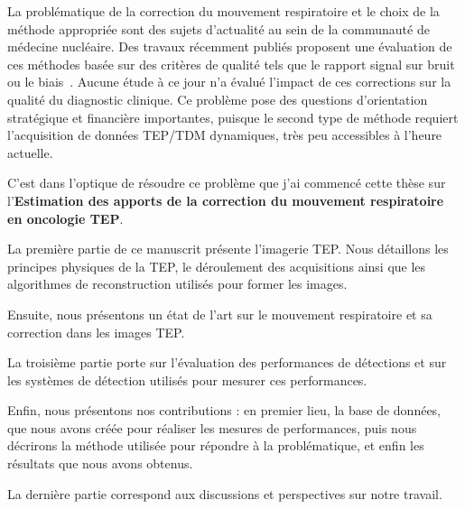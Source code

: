 La problématique de la correction du mouvement respiratoire et le choix de la méthode appropriée sont des sujets d’actualité au sein de la communauté de médecine nucléaire. Des travaux récemment publiés proposent une évaluation de ces méthodes basée sur des critères de qualité tels que le rapport signal sur bruit ou le biais~\cite{visvikis2004evaluation}. Aucune étude à ce jour n’a évalué l’impact de ces corrections sur la qualité du diagnostic clinique. Ce problème pose des questions d’orientation stratégique et financière importantes, puisque le second type de méthode requiert l’acquisition de données TEP/TDM dynamiques, très peu accessibles à l’heure actuelle.

C'est dans l'optique de résoudre ce problème que j'ai commencé cette thèse sur l'\textbf{Estimation des apports de la correction du mouvement respiratoire en oncologie TEP}.



La première partie de ce manuscrit présente l'imagerie TEP. Nous détaillons les principes physiques de la TEP, le déroulement des acquisitions ainsi que les algorithmes de reconstruction utilisés pour former les images.

Ensuite, nous présentons un état de l'art sur le mouvement respiratoire et sa correction dans les images TEP.

La troisième partie porte sur l'évaluation des performances de détections et sur les systèmes de détection utilisés pour mesurer ces performances.

Enfin, nous présentons nos contributions : en premier lieu, la base de données, que nous avons créée pour réaliser les mesures de performances, puis nous décrirons la méthode utilisée pour répondre à la problématique, et enfin les résultats que nous avons obtenus.

La dernière partie correspond aux discussions et perspectives sur notre travail.
